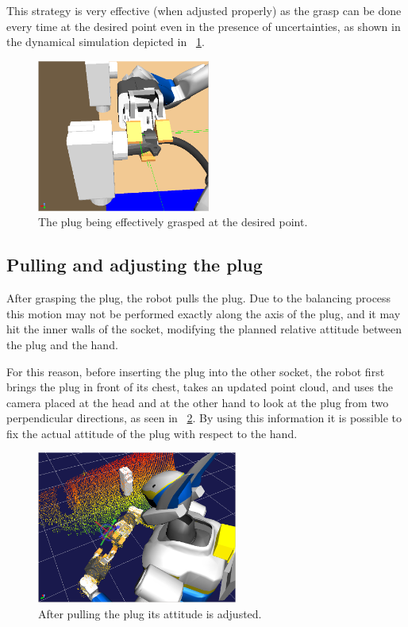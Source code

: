 		This strategy is very effective (when adjusted properly) as the grasp can be done every time at the
		desired point even in the presence of uncertainties, as shown in the dynamical simulation depicted
		in \figurename~\ref{fig:GraspPlug}.
		
		\begin{figure}[b]
			\centering
			\includegraphics[height = 5cm]{img/GraspPlug}
			\caption{The plug being effectively grasped at the desired point.}
			\label{fig:GraspPlug}
		\end{figure}
		
	\subsection{Pulling and adjusting the plug}
		
		After grasping the plug, the robot pulls the plug.
		Due to the balancing process this motion may not be performed exactly along the axis of the plug,
		and it may hit the inner walls of the socket, modifying the planned relative attitude between the
		plug and the hand.
		
		For this reason, before inserting the plug into the other socket, the robot first brings the plug
		in front of its chest, takes an updated point cloud, and uses the camera placed at the head and
		at the other hand to look at the plug from two perpendicular directions, as seen in
		\figurename~\ref{fig:WatchPlug}.
		By using this information it is possible to fix the actual attitude of the plug with respect to
		the hand.
		
		\begin{figure}[t]
			\centering
			\includegraphics[height = 5cm]{img/WatchPlug}
			\caption{After pulling the plug its attitude is adjusted.}
			\label{fig:WatchPlug}
		\end{figure}
		
